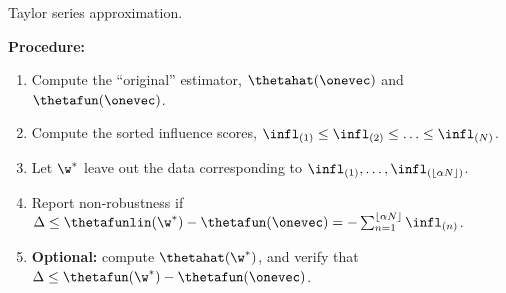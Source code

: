\begin{frame}{Taylor series approximation.}

\textbf{Procedure:}

\begin{enumerate}
    \item<2-> Compute the ``original'' estimator, $\thetahat(\onevec)$ and
    $\thetafun(\onevec)$.
    \item<3-> Compute the sorted influence scores,
        $\infl_{(1)} \le \infl_{(2)} \le \ldots \le \infl_{(N)}$.
    \item<4-> Let $\w^*$ leave out the data corresponding to
    $\infl_{(1)},  \ldots , \infl_{(\lfloor \alpha N \rfloor)}$.
    \item<5-> Report non-robustness if
        $ \Delta \le \thetafunlin(\w^*) - \thetafun(\onevec)  =
            - \sum_{n=1}^{\lfloor \alpha N \rfloor} \infl_{(n)}$.
    \item<6-> \textbf{Optional: } compute $\thetahat(\w^*)$, and verify
    that $\Delta \le \thetafun(\w^*) - \thetafun(\onevec)$.
\end{enumerate}






\end{frame}
